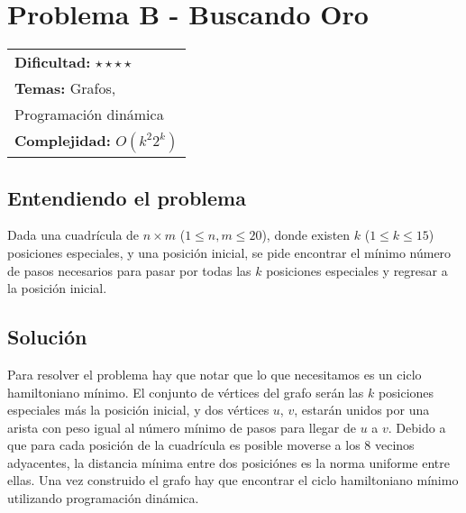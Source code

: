 \section{Problema B - Buscando Oro}

\hfill
\begin{tabular}{@{}l@{}}
\textbf{Dificultad:} $\star \star \star \star$\\
\textbf{Temas:} Grafos, \\Programación dinámica\\
\textbf{Complejidad:} $O(k^2 2^k)$
\end{tabular}

\subsection*{Entendiendo el problema}
Dada una cuadrícula de $n \times m$ ($1 \leq n, m \leq 20$), donde existen $k$ ($1 \leq k \leq 15$) posiciones especiales, y una posición inicial, se pide encontrar el mínimo número de pasos necesarios para pasar por todas las $k$ posiciones especiales y regresar a la posición inicial.

\subsection*{Solución}
Para resolver el problema hay que notar que lo que necesitamos es un ciclo hamiltoniano mínimo. El conjunto de vértices del grafo serán las $k$ posiciones especiales más la posición inicial, y dos vértices $u$, $v$, estarán unidos por una arista con peso igual al número mínimo de pasos para llegar de $u$ a $v$. Debido a que para cada posición de la cuadrícula es posible moverse a los 8 vecinos adyacentes, la distancia mínima entre dos posiciónes es la norma uniforme entre ellas. Una vez construido el grafo hay que encontrar el ciclo hamiltoniano mínimo utilizando programación dinámica.
